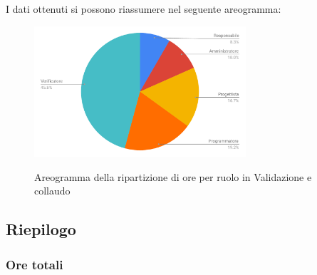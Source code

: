 I dati ottenuti si possono riassumere nel seguente areogramma:
\begin{figure}[H] 
			\centering 
				\includegraphics[width=0.7\textwidth]{res/images/areogramma_validazione.pdf}\\
				\caption{Areogramma della ripartizione di ore per ruolo in Validazione e collaudo}
			\label{AreogrammaValidazione}
\end{figure}


\subsection{Riepilogo}
\subsubsection{Ore totali}
